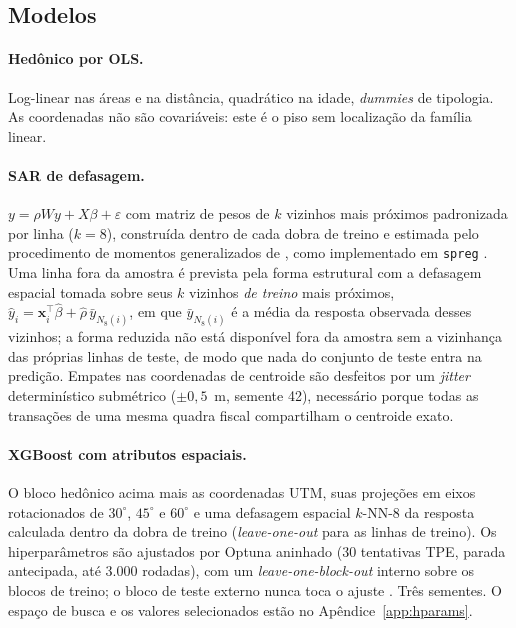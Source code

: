 \documentclass[11pt,a4paper]{article}
\begin{document}
\subsection{Modelos}

\paragraph{Hedônico por OLS.} Log-linear nas áreas e na distância, quadrático na idade,
\emph{dummies} de tipologia. As coordenadas não são covariáveis: este é o piso sem localização
da família linear.

\paragraph{SAR de defasagem.} $y = \rho W y + X\beta + \varepsilon$ com matriz de pesos de $k$
vizinhos mais próximos padronizada por linha ($k = 8$), construída dentro de cada dobra de
treino e estimada pelo procedimento de momentos generalizados de \citet{kelejian1998}, como
implementado em \texttt{spreg} \citep{rey2010pysal}. Uma linha fora da amostra é prevista pela
forma estrutural com a defasagem espacial tomada sobre seus $k$ vizinhos \emph{de treino} mais
próximos, $\hat y_i = \mathbf{x}_i^{\top}\hat\beta + \hat\rho\,\bar y_{N_8(i)}$, em que
$\bar y_{N_8(i)}$ é a média da resposta observada desses vizinhos; a forma reduzida não está
disponível fora da amostra sem a vizinhança das próprias linhas de teste, de modo que nada do
conjunto de teste entra na predição. Empates nas coordenadas de centroide são desfeitos por um
\emph{jitter} determinístico submétrico ($\pm 0{,}5$~m, semente 42), necessário porque todas as
transações de uma mesma quadra fiscal compartilham o centroide exato.

\paragraph{XGBoost com atributos espaciais.} O bloco hedônico acima mais as coordenadas UTM,
suas projeções em eixos rotacionados de $30^{\circ}$, $45^{\circ}$ e $60^{\circ}$
\citep{moller2020} e uma defasagem espacial $k$-NN-8 da resposta calculada dentro da dobra de
treino (\emph{leave-one-out} para as linhas de treino). Os hiperparâmetros são ajustados por
Optuna aninhado (30 tentativas TPE, parada antecipada, até 3.000 rodadas), com um
\emph{leave-one-block-out} interno sobre os blocos de treino; o bloco de teste externo nunca
toca o ajuste \citep{chen2016xgboost,akiba2019optuna}. Três sementes. O espaço de busca e os
valores selecionados estão no Apêndice~\ref{app:hparams}.
\end{document}
